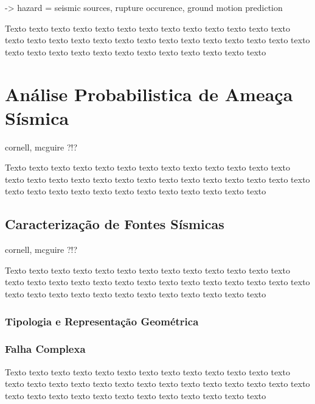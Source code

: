 -> hazard = seismic sources, 
			rupture occurence, 
			ground motion prediction 



Texto texto texto texto texto texto texto texto texto texto texto texto texto
texto texto texto texto texto texto texto texto texto texto texto texto texto
texto texto texto texto texto texto texto texto texto texto texto texto texto



\section{Análise Probabilistica de Ameaça Sísmica}
\label{sec:psha}


cornell, mcguire ?!?


Texto texto texto texto texto texto texto texto texto texto texto texto texto
texto texto texto texto texto texto texto texto texto texto texto texto texto
texto texto texto texto texto texto texto texto texto texto texto texto texto



\subsection{Caracterização de Fontes Sísmicas}
\label{sec:fontes}

cornell, mcguire ?!?


Texto texto texto texto texto texto texto texto texto texto texto texto texto
texto texto texto texto texto texto texto texto texto texto texto texto texto
texto texto texto texto texto texto texto texto texto texto texto texto texto



\subsubsection{Tipologia e Representação Geométrica}
\label{sec:fontes_tipologia}


\subsubsection{Falha Complexa}
\label{sec:fonte_falha_complexa}


Texto texto texto texto texto texto texto texto texto texto texto texto texto
texto texto texto texto texto texto texto texto texto texto texto texto texto
texto texto texto texto texto texto texto texto texto texto texto texto texto



